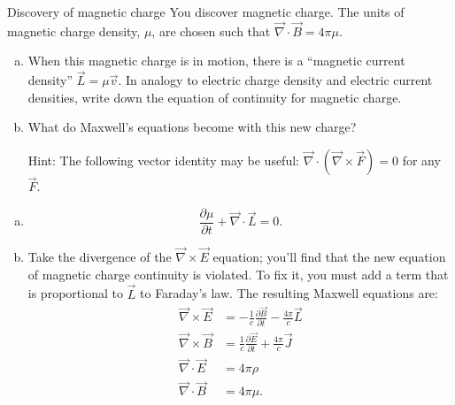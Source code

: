 \documentclass[makesolutionspdf]{esg8022pset}
\begin{document}
\begin{problem}{Discovery of magnetic charge}
  You discover magnetic charge.  The units of magnetic charge density,
  $\mu$, are chosen such that $\vec\nabla\cdot\vec B = 4\pi\mu$.

  \begin{enumerate}[(a)]
    \item When this magnetic charge is in motion,
      there is a ``magnetic current density'' $\vec{L} = \mu \vec{v}$.  In
      analogy to electric charge density and electric current densities,
      write down the equation of continuity for magnetic charge.
    \item What do Maxwell's equations become with this
      new charge? \par\noindent
      Hint: The following vector identity may be useful: $\vec\nabla\cdot(\vec{\nabla}\times\vec{F}) = 0$ for any $\vec{F}$.
  \end{enumerate}
\end{problem}

\begin{solution}
  \begin{enumerate}[(a)]
    \item 
      \begin{equation}
        \frac{\partial \mu}{\partial t} + \vec{\nabla}\cdot\vec{L} = 0.
      \end{equation}
    \item Take the divergence of the $\vec\nabla\times\vec E$ equation; you'll
      find that the new equation of magnetic charge continuity is violated.
      To fix it, you must add a term that is proportional to $\vec L$ to
      Faraday's law.  The resulting Maxwell equations are:
      \begin{align}
        \vec{\nabla}\times\vec{E} &= -\frac{1}{c}\frac{\partial
          \vec{B}}{\partial t}-\frac{4\pi}{c}\vec{L}\\
        \vec{\nabla}\times\vec{B} &= \frac{1}{c}\frac{\partial
          \vec{E}}{\partial t}+\frac{4\pi}{c}\vec{J}\\
        \vec{\nabla}\cdot\vec{E}  &= 4\pi\rho\\
        \vec{\nabla}\cdot\vec{B}  &= 4\pi\mu.
      \end{align}
  \end{enumerate}
\end{solution}
\end{document}
